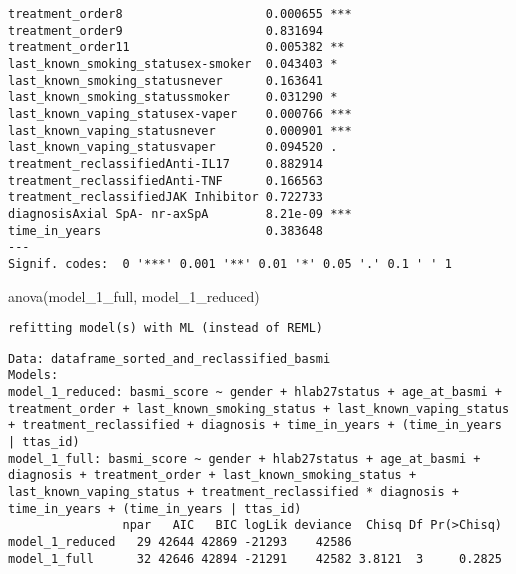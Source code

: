 \documentclass[
  letterpaper,
  DIV=11,
  numbers=noendperiod]{scrartcl}
\newenvironment{Shaded}{\begin{snugshade}}{\end{snugshade}}
\newcommand{\FunctionTok}[1]{\textcolor[rgb]{0.28,0.35,0.67}{#1}}
\newcommand{\NormalTok}[1]{\textcolor[rgb]{0.00,0.23,0.31}{#1}}
\begin{document}
\begin{verbatim}
treatment_order8                    0.000655 ***
treatment_order9                    0.831694    
treatment_order11                   0.005382 ** 
last_known_smoking_statusex-smoker  0.043403 *  
last_known_smoking_statusnever      0.163641    
last_known_smoking_statussmoker     0.031290 *  
last_known_vaping_statusex-vaper    0.000766 ***
last_known_vaping_statusnever       0.000901 ***
last_known_vaping_statusvaper       0.094520 .  
treatment_reclassifiedAnti-IL17     0.882914    
treatment_reclassifiedAnti-TNF      0.166563    
treatment_reclassifiedJAK Inhibitor 0.722733    
diagnosisAxial SpA- nr-axSpA        8.21e-09 ***
time_in_years                       0.383648    
---
Signif. codes:  0 '***' 0.001 '**' 0.01 '*' 0.05 '.' 0.1 ' ' 1
\end{verbatim}

\begin{Shaded}
\begin{Highlighting}[]
\FunctionTok{anova}\NormalTok{(model\_1\_full, model\_1\_reduced)}
\end{Highlighting}
\end{Shaded}

\begin{verbatim}
refitting model(s) with ML (instead of REML)
\end{verbatim}

\begin{verbatim}
Data: dataframe_sorted_and_reclassified_basmi
Models:
model_1_reduced: basmi_score ~ gender + hlab27status + age_at_basmi + treatment_order + last_known_smoking_status + last_known_vaping_status + treatment_reclassified + diagnosis + time_in_years + (time_in_years | ttas_id)
model_1_full: basmi_score ~ gender + hlab27status + age_at_basmi + diagnosis + treatment_order + last_known_smoking_status + last_known_vaping_status + treatment_reclassified * diagnosis + time_in_years + (time_in_years | ttas_id)
                npar   AIC   BIC logLik deviance  Chisq Df Pr(>Chisq)
model_1_reduced   29 42644 42869 -21293    42586                     
model_1_full      32 42646 42894 -21291    42582 3.8121  3     0.2825
\end{verbatim}
\end{document}
